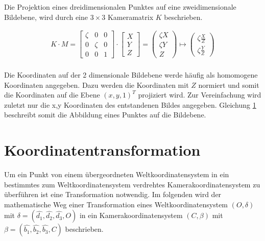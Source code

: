 Die Projektion eines dreidimensionalen Punktes auf eine zweidimensionale Bildebene, wird durch eine $3 \times 3$ Kameramatrix $K$ beschrieben. 

\begin{gather}
K\cdot M =
\begin{bmatrix}
\zeta&0&0\\
0&\zeta&0\\
0&0&1
\end{bmatrix}
\cdot
\begin{bmatrix}
X\\Y\\Z
\end{bmatrix}
=
\begin{pmatrix}
\zeta X\\ \zeta Y\\ Z
\end{pmatrix}
\mapsto
\begin{pmatrix}
\zeta \frac{X}{Z}\\ \zeta \frac{Y}{Z}
\end{pmatrix}
	\label{eq:2.1}
\end{gather}\\

Die Koordinaten auf der 2 dimensionale Bildebene werde häufig als homomogene Koordinaten angegeben. Dazu werden die Koordinaten mit $Z$ normiert und somit die Koordinaten auf die Ebene $(x,y,1)^T$ projiziert wird. Zur Vereinfachung wird zuletzt nur die x,y Koordinaten des entstandenen Bildes angegeben. Gleichung \ref{} beschreibt somit die Abbildung eines Punktes auf die Bildebene.

\section{Koordinatentransformation}

Um ein Punkt von einem übergeordneten Weltkoordinatensystem in ein bestimmtes zum Weltkoordinatensystem verdrehtes Kamerakoordinatensystem zu überführen ist eine Transformation notwendig. Im folgenden wird der mathematische Weg einer Transformation eines Weltkoordinatensystem $(O,\delta)$ mit $\delta = (\hat{d_1},\hat{d_2},\hat{d_3},O)$ in ein Kamerakoordinatensystem $(C,\beta)$ mit $\beta = (\hat{b_1},\hat{b_2},\hat{b_3},C)$ beschrieben.



